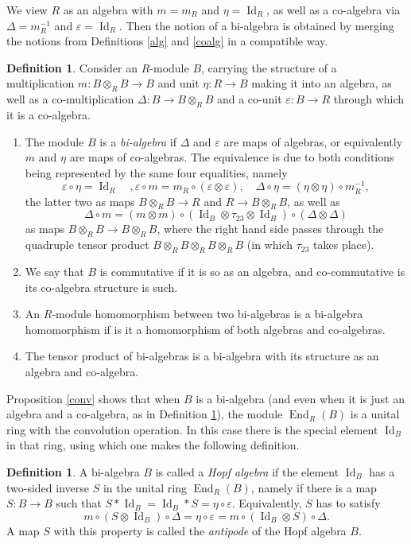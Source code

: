 \documentclass{article}
\theoremstyle{definition}
\newtheorem{defn}[thm]{Definition}
\begin{document}
\medskip

We view $R$ as an algebra with $m=m_{R}$ and $\eta=\operatorname{Id}_{R}$, as well as a co-algebra via $\Delta=m_{R}^{-1}$ and $\varepsilon=\operatorname{Id}_{R}$. Then the notion of a bi-algebra is obtained by merging the notions from Definitions \ref{alg} and \ref{coalg} in a compatible way.
\begin{defn}
Consider an $R$-module $B$, carrying the structure of a multiplication $m:B\otimes_{R}B \to B$ and unit $\eta:R \to B$ making it into an algebra, as well as a co-multiplication $\Delta:B \to B\otimes_{R}B$ and a co-unit $\varepsilon:B \to R$ through which it is a co-algebra.
\begin{enumerate}[$(i)$]
\item The module $B$ is a \emph{bi-algebra} if $\Delta$ and $\varepsilon$ are maps of algebras, or equivalently $m$ and $\eta$ are maps of co-algebras. The equivalence is due to both conditions being represented by the same four equalities, namely \[\varepsilon\circ\eta=\operatorname{Id}_{R}\quad,\varepsilon \circ m=m_{R}\circ(\varepsilon\otimes\varepsilon),\quad\Delta\circ\eta=(\eta\otimes\eta) \circ m_{R}^{-1},\] the latter two as maps $B\otimes_{R}B \to R$ and $R \to B\otimes_{R}B$, as well as \[\Delta \circ m=(m \otimes m)\circ(\operatorname{Id}_{B}\otimes\tau_{23}\otimes\operatorname{Id}_{B})\circ(\Delta\otimes\Delta)\] as maps $B\otimes_{R}B \to B\otimes_{R}B$, where the right hand side passes through the quadruple tensor product $B\otimes_{R}B\otimes_{R}B\otimes_{R}B$ (in which $\tau_{23}$ takes place).
\item We say that $B$ is commutative if it is so as an algebra, and co-commutative is its co-algebra structure is such.
\item An $R$-module homomorphism between two bi-algebras is a bi-algebra homomorphism if is it a homomorphism of both algebras and co-algebras.
\item The tensor product of bi-algebras is a bi-algebra with its structure as an algebra and co-algebra.
\end{enumerate} \label{bialg}
\end{defn}
Proposition \ref{conv} shows that when $B$ is a bi-algebra (and even when it is just an algebra and a co-algebra, as in Definition \ref{bialg}), the module $\operatorname{End}_{R}(B)$ is a unital ring with the convolution operation. In this case there is the special element $\operatorname{Id}_{B}$ in that ring, using which one makes the following definition.
\begin{defn}
A bi-algebra $B$ is called a \emph{Hopf algebra} if the element $\operatorname{Id}_{B}$ has a two-sided inverse $S$ in the unital ring $\operatorname{End}_{R}(B)$, namely if there is a map $S:B \to B$ such that $S*\operatorname{Id}_{B}=\operatorname{Id}_{B}*S=\eta\circ\varepsilon$. Equivalently, $S$ has to satisfy \[m\circ(S\otimes\operatorname{Id}_{B})\circ\Delta=\eta\circ\varepsilon=m\circ(\operatorname{Id}_{B} \otimes S)\circ\Delta.\] A map $S$ with this property is called the \emph{antipode} of the Hopf algebra $B$. \label{Hopfdef}
\end{defn}
\end{document}
